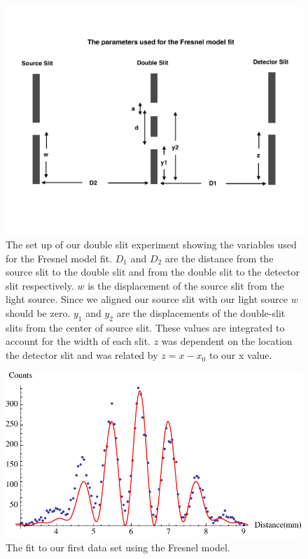 \documentclass[prb,preprint]{revtex4-1}
\begin{document}
\begin{figure}[h!]
\centering
\includegraphics[width=6in]{fresnelsetup.pdf}
\caption{The set up of our double slit experiment showing the variables used for the Fresnel model fit. $D_1$ and $D_2$ are the distance from the source slit to the double slit and from the double slit to the detector slit respectively. $w$ is the displacement of the source slit from the light source. Since we aligned our source slit with our light source $w$ should be zero. $y_1$ and $y_2$ are the displacements of the double-slit slits from the center of source slit. These values are integrated to account for the width of each slit. $z$ was dependent on the location the detector slit and was related by $z = x - x_0$ to our x value.}
\label{fresnelsetup}
\end{figure}

\begin{figure}[h!]
\centering
\includegraphics[width=6in]{doublefresnel1.pdf}
\caption{The fit to our first data set using the Fresnel model.}
\label{doublefresnel1}
\end{figure}
\end{document}
